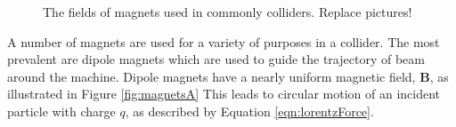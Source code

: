 
\begin{figure}[h!]
\captionsetup[subfigure]{position=b}
\centering
{}
\caption{The fields of magnets used in commonly colliders. {\color{red} Replace pictures!}}
\label{fig:magnets}
\end{figure}

A number of magnets are used for a variety of purposes in a collider.
The most prevalent are dipole magnets which are used to guide the trajectory of beam around the machine.
Dipole magnets have a nearly uniform magnetic field, $\pmb B$, as illustrated in Figure \ref{fig:magnetsA}
This leads to circular motion of an incident particle with charge $q$, as described by Equation \ref{eqn:lorentzForce}.

